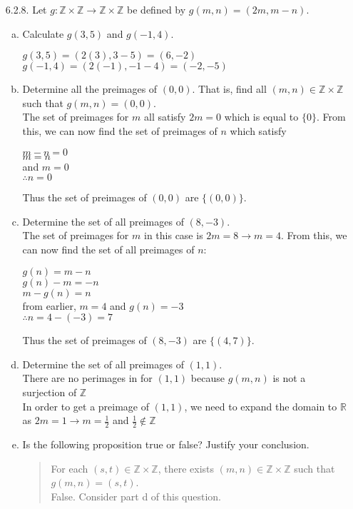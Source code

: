 \documentclass[11pt]{article}
\newcommand{\Z}{\mathbb Z}
\newcommand{\R}{\mathbb R}
\begin{document}
\begin{itemize}
\hrulefill

\newpage
\item[6.2.8.] Let $g:\Z\times\Z\to\Z\times \Z$ be defined by $g(m,n)=(2m,m-n)$.
\begin{enumerate}[(a)]
\item Calculate $g(3,5)$ and $g(-1,4)$.
\begin{center}
    $g(3,5) = (2(3),3-5) = (6,-2)$\\
    $g(-1,4) = (2(-1),-1-4) = (-2,-5)$\\
\end{center}
\item Determine all the preimages of $(0,0)$. That is, find all $(m,n)\in\Z\times\Z$ such that $g(m,n)=(0,0)$.\\
\indent The set of preimages for $m$ all satisfy $2m = 0$ which is equal to $\{0\}$. From this, we can now find the
set of preimages of $n$ which satisfy
\begin{center}
    $m-n = 0$\\
    $m = n$\\
    and $m = 0$\\
    $\therefore n=0$
\end{center}
Thus the set of preimages of $(0,0)$ are $\{(0,0)\}$.
\item Determine the set of all preimages of $(8,-3)$.\\
\indent The set of preimages for $m$ in this case is $2m = 8\rightarrow m = 4$. From this, we can now find the set
of all preimages of $n$:
\begin{center}
    $g(n) = m-n$\\
    $g(n) - m = -n$\\
    $m-g(n) = n$\\
    from earlier, $m = 4$ and $g(n) = -3$\\
    $\therefore n = 4 - (-3) = 7$
\end{center}
Thus the set of preimages of $(8,-3)$ are $\{(4,7)\}$.

\item Determine the set of all preimages of $(1,1)$.\\
\indent There are no perimages in for $(1,1)$ because $g(m,n)$ is not a surjection of $\Z$\\
In order to get a preimage of $(1,1)$, we need to expand the domain to $\R$ as $2m=1\rightarrow m = \frac{1}{2}$
and $\frac{1}{2} \notin \Z$
\item Is the following proposition true or false? Justify your conclusion.
\begin{quote}
For each $(s,t)\in\Z\times\Z$, there exists $(m,n)\in\Z\times\Z$ such that $g(m,n)=(s,t)$.\\
\indent False. Consider part d of this question. 
\end{quote}


\end{enumerate}
\end{itemize}
\end{document}
